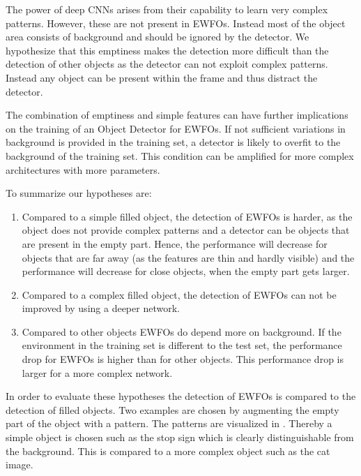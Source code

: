 The power of deep \acp{CNN} arises from their capability to learn very complex patterns. However, these are not present in \acp{EWFO}. Instead most of the object area consists of background and should be ignored by the detector. We hypothesize that this emptiness makes the detection more difficult than the detection of other objects as the detector can not exploit complex patterns. Instead any object can be present within the frame and thus distract the detector.

The combination of emptiness and simple features can have further implications on the training of an Object Detector for \acp{EWFO}. If not sufficient variations in background is provided in the training set, a detector is likely to overfit to the background of the training set. This condition can be amplified for more complex architectures with more parameters.

To summarize our hypotheses are:
\begin{enumerate}
	\item Compared to a simple filled object, the detection of \acp{EWFO} is harder, as the object does not provide complex patterns and a detector can be objects that are present in the empty part. Hence, the performance will decrease for objects that are far away (as the features are thin and hardly visible) and the performance will decrease for close objects, when the empty part gets larger.
	\item Compared to a complex filled object, the detection of \acp{EWFO} can not be improved by using a deeper network.
	\item Compared to other objects \acp{EWFO} do depend more on background. If the environment in the training set is different to the test set, the performance drop for \acp{EWFO} is higher than for other objects. This performance drop is larger for a more complex network.
\end{enumerate}

In order to evaluate these hypotheses the detection of \acp{EWFO} is compared to the detection of filled objects. Two examples are chosen by augmenting the empty part of the object with a pattern. The patterns are visualized in . Thereby a simple object is chosen such as the stop sign which is clearly distinguishable from the background. This is compared to a more complex object such as the cat image.

